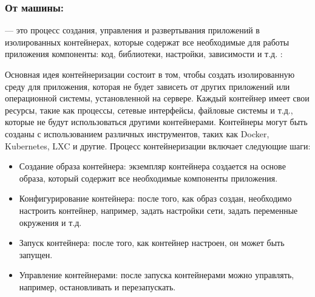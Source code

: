 \documentclass[letterpaper,10pt,russian]{sphinxmanual}
\begin{document}
\subsubsection{От машины:}
\label{\detokenize{educational_materials/stages/content:id22}}
\sphinxAtStartPar
{} — это процесс создания, управления и развертывания приложений в изолированных контейнерах, которые содержат все необходимые для работы приложения компоненты: код, библиотеки, настройки, зависимости и т.д.
: 

\sphinxAtStartPar
Основная идея контейнеризации состоит в том, чтобы создать изолированную среду для приложения, которая не будет зависеть от других приложений или операционной системы, установленной на сервере. Каждый контейнер имеет свои ресурсы, такие как процессы, сетевые интерфейсы, файловые системы и т.д., которые не будут использоваться другими контейнерами. Контейнеры могут быть созданы с использованием различных инструментов, таких как Docker, Kubernetes, LXC и другие. Процесс контейнеризации включает следующие шаги:
\begin{itemize}
\item {} 
\sphinxAtStartPar
Создание образа контейнера: экземпляр контейнера создается на основе образа, который содержит все необходимые компоненты приложения.

\item {} 
\sphinxAtStartPar
Конфигурирование контейнера: после того, как образ создан, необходимо настроить контейнер, например, задать настройки сети, задать переменные окружения и т.д.

\item {} 
\sphinxAtStartPar
Запуск контейнера: после того, как контейнер настроен, он может быть запущен.

\item {} 
\sphinxAtStartPar
Управление контейнерами: после запуска контейнерами можно управлять, например, остановливать и перезапускать.

\end{itemize}
\end{document}
